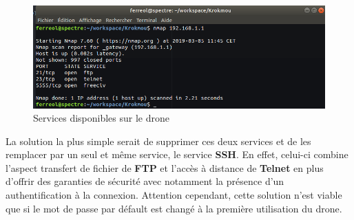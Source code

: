 \begin{figure}[H]
  \centering
  \includegraphics[scale=0.5]{images/scan_drone}
  \caption{Services disponibles sur le drone}
\end{figure}

La solution la plus simple serait de supprimer ces deux services et de les remplacer par un seul et même service, le service \textbf{SSH}. En effet, celui-ci combine l'aspect transfert de fichier de \textbf{FTP} et l'accès à distance de \textbf{Telnet} en plus d'offrir des garanties de sécurité avec notamment la présence d'un authentification à la connexion. Attention cependant, cette solution n'est viable que si le mot de passe par défault est changé à la première utilisation du drone.
